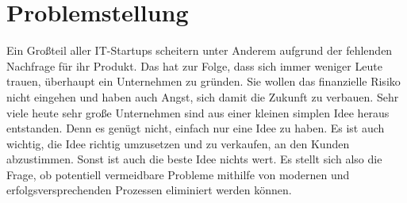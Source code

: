 %
\section{Problemstellung}

Ein Großteil aller IT-Startups scheitern unter Anderem aufgrund der fehlenden Nachfrage für ihr Produkt. Das hat zur Folge, dass sich immer weniger Leute trauen, überhaupt ein Unternehmen zu gründen. Sie wollen das finanzielle Risiko nicht eingehen und haben auch Angst, sich damit die Zukunft zu verbauen. Sehr viele heute sehr große Unternehmen sind aus einer kleinen simplen Idee heraus entstanden. Denn es genügt nicht, einfach nur eine Idee zu haben. Es ist auch wichtig, die Idee richtig umzusetzen und zu verkaufen, an den Kunden abzustimmen. Sonst ist auch die beste Idee nichts wert. Es stellt sich also die Frage, ob potentiell vermeidbare Probleme mithilfe von modernen und erfolgsversprechenden Prozessen eliminiert werden können. 

